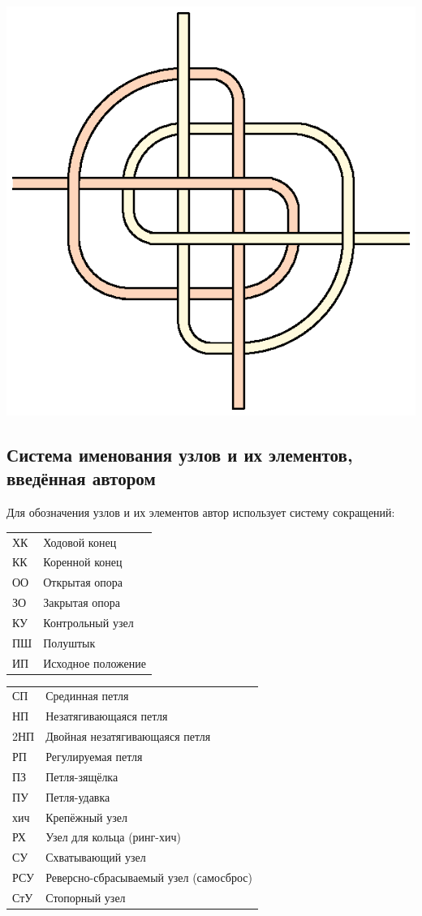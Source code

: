 \includegraphics[scale=0.5]{images/infinity.eps}


\subsection{Система именования узлов и их элементов, введённая автором}
Для обозначения узлов и их элементов автор использует систему сокращений:

\begin{tabular}{ll}
	ХК & Ходовой конец \\
	КК & Коренной конец \\
	ОО & Открытая опора \\
	ЗО & Закрытая опора \\
	КУ & Контрольный узел \\
	ПШ & Полуштык \\
	ИП & Исходное положение
\end{tabular}

\begin{tabular}{ll}
	СП & Срединная петля \\
	НП & Незатягивающаяся петля \\
	2НП & Двойная незатягивающаяся петля \\
	РП & Регулируемая петля \\
	ПЗ & Петля-зящёлка \\
	ПУ & Петля-удавка \\
	хич & Крепёжный узел \\
	РХ & Узел для кольца (ринг-хич) \\
	СУ & Схватывающий узел \\
	РСУ & Реверсно-сбрасываемый узел (самосброс) \\
	СтУ & Стопорный узел
\end{tabular}
